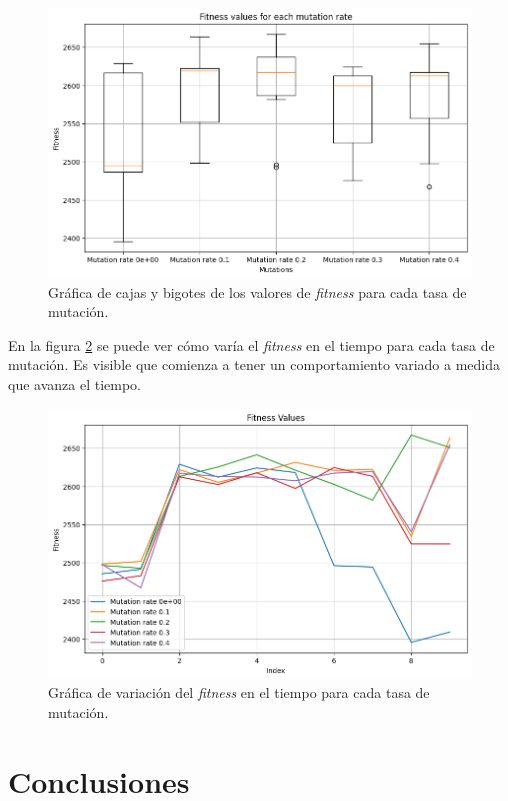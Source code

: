 \documentclass[twocolumn, fontsize=10pt]{article}
\begin{document}
\begin{figure}[H]
  \centering
  \includegraphics[width=\columnwidth]{assets/mutation rate boxplot.png}
  \caption{Gráfica de cajas y bigotes de los valores de \textit{fitness} para cada tasa de mutación.}
  \label{fig:mutation}
  \end{figure}

En la figura \ref{fig:mutation2} se puede ver cómo varía el \textit{fitness} en el tiempo para cada tasa de mutación. 
Es visible que comienza a tener un comportamiento variado a medida que avanza el tiempo.

  \begin{figure}[H]
    \centering
    \includegraphics[width=\columnwidth]{assets/mutation rate fitness.png}
    \caption{Gráfica de variación del \textit{fitness} en el tiempo para cada tasa de mutación.}
    \label{fig:mutation2}
    \end{figure}


\section{Conclusiones}
\end{document}
